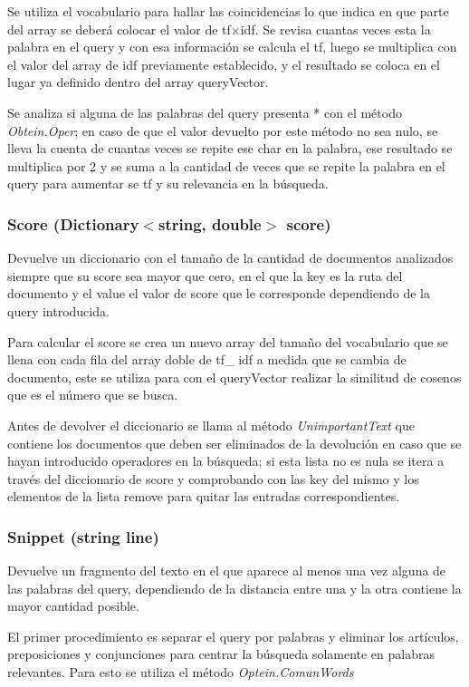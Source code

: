 \documentclass[a4paper,12pt,]{article}
\begin{document}
Se utiliza el vocabulario para hallar las coincidencias lo que indica en que parte del array se deberá colocar 
el valor de tf$\times $idf. Se revisa cuantas veces esta la palabra en el query y con esa información se calcula 
el tf, luego se multiplica con el valor del array de idf previamente establecido, y el resultado se coloca en el 
lugar ya definido dentro del array queryVector.

Se analiza si alguna de las palabras del query presenta * con el método \textit{Obtein.Oper}; en caso de que el 
valor devuelto por este método no sea nulo, se lleva la cuenta de cuantas veces se repite ese char en la palabra, 
ese resultado se multiplica por 2 y se suma a la cantidad de veces que se repite la palabra en el query para 
aumentar se tf y su relevancia en la búsqueda.

\subsubsection*{Score (Dictionary$<$string, double$>$ score)}
Devuelve un diccionario con el tamaño de la cantidad de documentos analizados siempre que su score sea mayor 
que cero, en el que la key es la ruta del documento y el value el valor de score que le corresponde dependiendo 
de la query introducida.

Para calcular el score se crea un nuevo array del tamaño del vocabulario que se llena con cada fila del array 
doble de tf\_ idf a medida que se cambia de documento, este se utiliza para con el queryVector realizar la 
similitud de cosenos que es el número que se busca. 

Antes de devolver el diccionario se llama al método \textit{UnimportantText} que contiene los documentos que 
deben ser eliminados de la devolución en caso que se hayan introducido operadores en la búsqueda; si esta lista 
no es nula se itera a través del diccionario de score y comprobando con las key del mismo y los elementos de la 
lista remove para quitar las entradas correspondientes.

\subsubsection*{Snippet (string line)}
Devuelve un fragmento del texto en el que aparece al menos una vez alguna de las palabras del query, dependiendo 
de la distancia entre una y la otra contiene la mayor cantidad posible.

El primer procedimiento es separar el query por palabras y eliminar los artículos, preposiciones y conjunciones 
para centrar la búsqueda solamente en palabras relevantes. Para esto se utiliza el método \textit{Optein.ComunWords}
\end{document}
